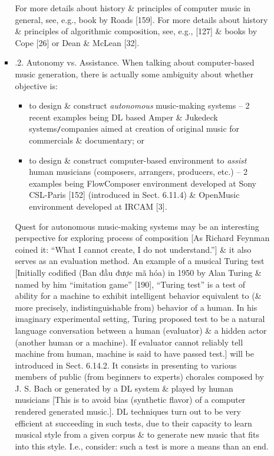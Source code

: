 \documentclass{article}
\begin{document}
\begin{itemize}
\begin{itemize}
\begin{itemize}
			For more details about history \& principles of computer music in general, see, e.g., book by Roads [159]. For more details about history \& principles of algorithmic composition, see, e.g., [127] \& books by Cope [26] or Dean \& McLean [32].			
			\item {.2. Autonomy vs. Assistance.} When talking about computer-based music generation, there is actually some ambiguity about whether objective is:
			\begin{itemize}
				\item to design \& construct {\it autonomous} music-making systems -- 2 recent examples being DL based Amper \& Jukedeck systems{\tt/}companies aimed at creation of original music for commercials \& documentary; or
				\item to design \& construct computer-based environment to {\it assist} human musicians (composers, arrangers, producers, etc.) -- 2 examples being FlowComposer environment developed at Sony CSL-Paris [152] (introduced in Sect. 6.11.4) \& OpenMusic environment developed at IRCAM [3].
			\end{itemize}
			Quest for autonomous music-making systems may be an interesting perspective for exploring process of composition [As {\sc Richard Feynman} coined it: ``What I cannot create, I do not understand.''] \& it also serves as an evaluation method. An example of a musical Turing test [Initially codified (Ban đầu được mã hóa) in 1950 by {\sc Alan Turing} \& named by him ``imitation game'' [190], ``Turing test'' is a test of ability for a machine to exhibit intelligent behavior equivalent to (\& more precisely, indistinguishable from) behavior of a human. In his imaginary experimental setting, {\sc Turing} proposed test to be a natural language conversation between a human (evaluator) \& a hidden actor (another human or a machine). If evaluator cannot reliably tell machine from human, machine is said to have passed test.] will be introduced in Sect. 6.14.2. It consists in presenting to various members of public (from beginners to experts) chorales composed by {\sc J. S. Bach} or generated by a DL system \& played by human musicians [This is to avoid bias (synthetic flavor) of a computer rendered generated music.]. DL techniques turn out to be very efficient at succeeding in such tests, due to their capacity to learn musical style from a given corpus \& to generate new music that fits into this style. I.e., consider: such a test is more a means than an end.
			

\end{itemize}
\end{itemize}
\end{itemize}
\end{document}
